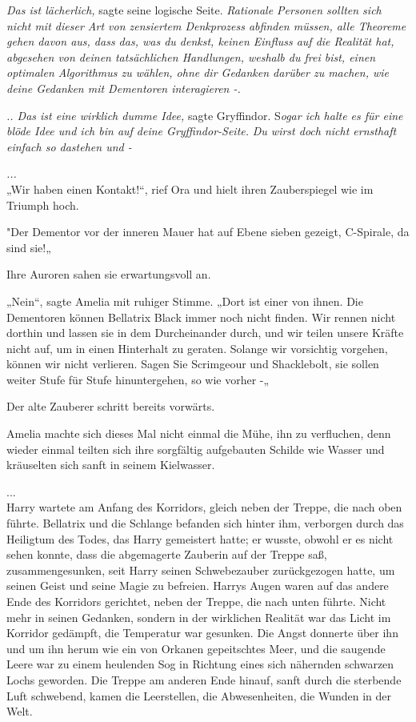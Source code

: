{\emph{Das ist lächerlich,} sagte seine logische Seite. \emph{Rationale Personen sollten sich nicht mit dieser Art von zensiertem Denkprozess abfinden müssen, alle Theoreme gehen davon aus, dass das, was du denkst, keinen Einfluss auf die Realität hat, abgesehen von deinen tatsächlichen Handlungen, weshalb du frei bist, einen optimalen Algorithmus zu wählen, ohne dir Gedanken darüber zu machen, wie deine Gedanken mit Dementoren interagieren -.}

\emph{.. Das ist eine wirklich dumme Idee,} sagte Gryffindor. S\emph{ogar ich halte es für eine} \emph{blöde Idee und ich bin auf deine Gryffindor-Seite.} \emph{Du wirst doch nicht ernsthaft einfach so dastehen und -}

\emph{...}\\ „Wir haben einen Kontakt!“, rief Ora und hielt ihren Zauberspiegel wie im Triumph hoch.

"Der Dementor vor der inneren Mauer hat auf Ebene sieben gezeigt, C-Spirale, da sind sie!„

Ihre Auroren sahen sie erwartungsvoll an.

„Nein“, sagte Amelia mit ruhiger Stimme. „Dort ist einer von ihnen. Die Dementoren können Bellatrix Black immer noch nicht finden. Wir rennen nicht dorthin und lassen sie in dem Durcheinander durch, und wir teilen unsere Kräfte nicht auf, um in einen Hinterhalt zu geraten. Solange wir vorsichtig vorgehen, können wir nicht verlieren. Sagen Sie Scrimgeour und Shacklebolt, sie sollen weiter Stufe für Stufe hinuntergehen, so wie vorher -„

Der alte Zauberer schritt bereits vorwärts.

Amelia machte sich dieses Mal nicht einmal die Mühe, ihn zu verfluchen, denn wieder einmal teilten sich ihre sorgfältig aufgebauten Schilde wie Wasser und kräuselten sich sanft in seinem Kielwasser.

...\\ Harry wartete am Anfang des Korridors, gleich neben der Treppe, die nach oben führte. Bellatrix und die Schlange befanden sich hinter ihm, verborgen durch das Heiligtum des Todes, das Harry gemeistert hatte; er wusste, obwohl er es nicht sehen konnte, dass die abgemagerte Zauberin auf der Treppe saß, zusammengesunken, seit Harry seinen Schwebezauber zurückgezogen hatte, um seinen Geist und seine Magie zu befreien. Harrys Augen waren auf das andere Ende des Korridors gerichtet, neben der Treppe, die nach unten führte. Nicht mehr in seinen Gedanken, sondern in der wirklichen Realität war das Licht im Korridor gedämpft, die Temperatur war gesunken. Die Angst donnerte über ihn und um ihn herum wie ein von Orkanen gepeitschtes Meer, und die saugende Leere war zu einem heulenden Sog in Richtung eines sich nähernden schwarzen Lochs geworden. Die Treppe am anderen Ende hinauf, sanft durch die sterbende Luft schwebend, kamen die Leerstellen, die Abwesenheiten, die Wunden in der Welt.

}
